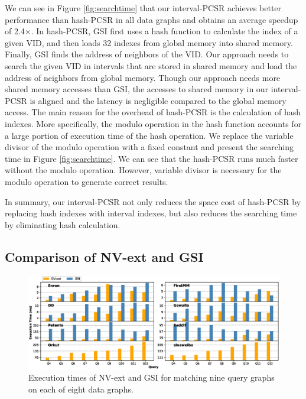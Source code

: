 We can see in Figure \ref{fig:searchtime} that our interval-PCSR achieves better performance than hash-PCSR in all data graphs and obtains an average speedup of 2.4$\times$. In hash-PCSR, GSI first uses a hash function to calculate the index of a given VID, and then loads 32 indexes from global memory into shared memory. Finally, GSI finds the address of neighbors of the VID. Our approach needs to search the given VID in intervals that are stored in shared memory and load the address of neighbors from global memory. Though our approach needs more shared memory accesses than GSI, the accesses to shared memory in our interval-PCSR is aligned and the latency is negligible compared to the global memory access. The main reason for the overhead of hash-PCSR is the calculation of hash indexes. More specifically, the modulo operation in the hash function accounts for a large portion of execution time of the hash operation. We replace the variable divisor of the modulo operation with a fixed constant and present the searching time in Figure \ref{fig:searchtime}. We can see that the hash-PCSR runs much faster without the modulo operation. However, variable divisor is necessary for the modulo operation to generate correct results.

In summary, our interval-PCSR not only reduces the space cost of hash-PCSR by replacing hash indexes with interval indexes, but also reduces the searching time by eliminating hash calculation.


\subsection{Comparison of NV-ext and GSI} \label{sec:comparegsi}
\begin{figure}
\centering
\includegraphics[width=\textwidth]{./figure/overperformance.eps}
\caption{Execution times of NV-ext and GSI for matching nine query graphs on each of eight data graphs.}	
\label{fig:overallperf}
\end{figure}

